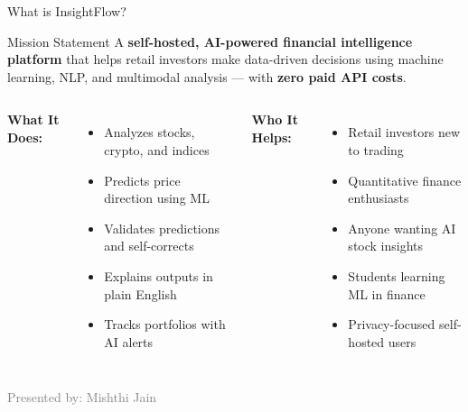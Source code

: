 \documentclass[aspectratio=169, 11pt]{beamer}
\begin{document}
\begin{frame}{What is InsightFlow?}
\begin{block}{Mission Statement}
A \textbf{self-hosted, AI-powered financial intelligence platform} that helps retail investors make data-driven decisions using machine learning, NLP, and multimodal analysis --- with \textbf{zero paid API costs}.
\end{block}

\vspace{0.3cm}
\begin{columns}[T]
\textbf{What It Does:}
\begin{itemize}
    \item Analyzes stocks, crypto, and indices
    \item Predicts price direction using ML
    \item Validates predictions and self-corrects
    \item Explains outputs in plain English
    \item Tracks portfolios with AI alerts
\end{itemize}

\textbf{Who It Helps:}
\begin{itemize}
    \item Retail investors new to trading
    \item Quantitative finance enthusiasts
    \item Anyone wanting AI stock insights
    \item Students learning ML in finance
    \item Privacy-focused self-hosted users
\end{itemize}
\end{columns}
\vfill
{\tiny\textcolor{gray}{Presented by: Mishthi Jain}}
\end{frame}
\end{document}

